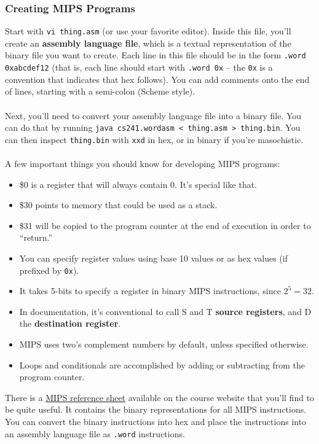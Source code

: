 \documentclass[]{article}
\theoremstyle{definition}
\begin{document}
			\subsubsection{Creating MIPS Programs}
			Start with \verb+vi thing.asm+ (or use your favorite editor). Inside this file, you'll create an \textbf{assembly language file}, which is a textual representation of the binary file you want to create. Each line in this file should be in the form \verb+.word 0xabcdef12+ (that is, each line should start with \verb+.word 0x+ -- the \verb+0x+ is a convention that indicates that hex follows). You can add comments onto the end of lines, starting with a semi-colon (Scheme style).
			\\ \\
			Next, you'll need to convert your assembly language file into a binary file. You can do that by running \verb+java cs241.wordasm < thing.asm > thing.bin+. You can then inspect \verb+thing.bin+ with \verb+xxd+ in hex, or in binary if you're masochistic.
			\\ \\
			A few important things you should know for developing MIPS programs:
			\begin{itemize}
				\item \$0 is a register that will always contain 0. It's special like that.
				\item \$30 points to memory that could be used as a stack.
				\item \$31 will be copied to the program counter at the end of execution in order to ``return.''
				\item You can specify register values using base 10 values or as hex values (if prefixed by \verb+0x+). 
				\item It takes 5-bits to specify a register in binary MIPS instructions, since $2^5 = 32$. 
				\item In documentation, it's conventional to call S and T \textbf{source registers}, and D the \textbf{destination register}. 
				\item MIPS uses two's complement numbers by default, unless specified otherwise.
				\item Loops and conditionals are accomplished by adding or subtracting from the program counter.
			\end{itemize}
			
			There is a \href{https://www.student.cs.uwaterloo.ca/~cs241/mips/mipsref.pdf}{MIPS reference sheet} available on the course website that you'll find to be quite useful. It contains the binary representations for all MIPS instructions. You can convert the binary instructions into hex and place the instructions into an assembly language file as \verb+.word+ instructions.
		
\end{document}
